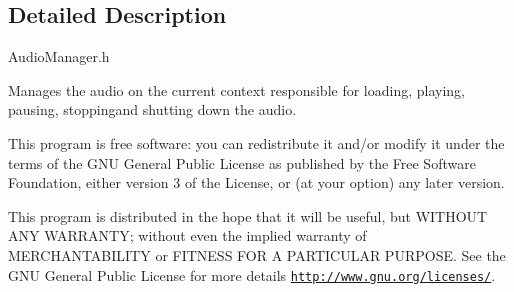 \subsection{Detailed Description}
Audio\-Manager.\-h

Manages the audio on the current context responsible for loading, playing, pausing, stoppingand shutting down the audio.

This program is free software\-: you can redistribute it and/or modify it under the terms of the G\-N\-U General Public License as published by the Free Software Foundation, either version 3 of the License, or (at your option) any later version.

This program is distributed in the hope that it will be useful, but W\-I\-T\-H\-O\-U\-T A\-N\-Y W\-A\-R\-R\-A\-N\-T\-Y; without even the implied warranty of M\-E\-R\-C\-H\-A\-N\-T\-A\-B\-I\-L\-I\-T\-Y or F\-I\-T\-N\-E\-S\-S F\-O\-R A P\-A\-R\-T\-I\-C\-U\-L\-A\-R P\-U\-R\-P\-O\-S\-E. See the G\-N\-U General Public License for more details \href{http://www.gnu.org/licenses/}{\tt http\-://www.\-gnu.\-org/licenses/}. 


